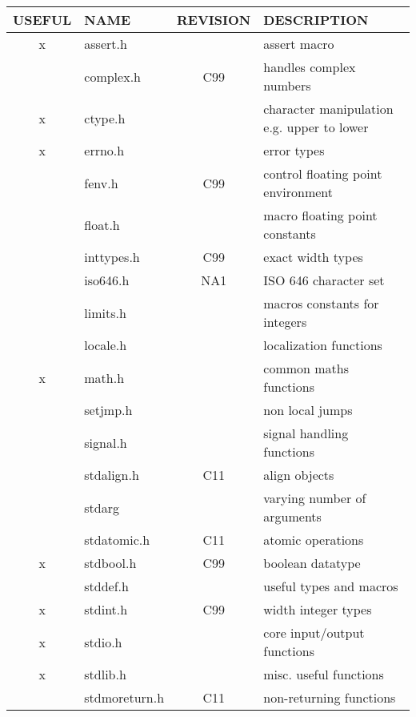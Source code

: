 
\begin{table}
\centering
  \begin{tabular}{ | c | l | c | l |}
    \hline
    USEFUL & NAME & REVISION & DESCRIPTION \\ \hline
    x          & assert.h &  & assert macro \\ \hline
               & complex.h & C99 & handles complex numbers \\ \hline
    x		   & ctype.h & & character manipulation e.g. upper to lower \\ \hline
    x          & errno.h &  & error types \\ \hline
               & fenv.h & C99 & control floating point environment \\ \hline
               & float.h &  & macro floating point constants \\ \hline
               & inttypes.h & C99 & exact width types \\ \hline
               & iso646.h & NA1 & ISO 646 character set \\ \hline
               & limits.h &  & macros constants for integers \\ \hline
               & locale.h &  & localization functions \\ \hline
    x          & math.h &  & common maths functions \\ \hline
               & setjmp.h &  & non local jumps \\ \hline
               & signal.h &  & signal handling functions \\ \hline
               & stdalign.h &  C11 & align objects \\ \hline
               & stdarg &  & varying number of arguments \\ \hline
               & stdatomic.h & C11 & atomic operations \\ \hline
    x          & stdbool.h & C99 & boolean datatype \\ \hline
               & stddef.h &  & useful types and macros \\ \hline
    x          & stdint.h & C99 & width integer types \\ \hline
    x          & stdio.h &  & core input/output functions \\ \hline
    x          & stdlib.h &  & misc. useful functions \\ \hline
               & stdmoreturn.h & C11 & non-returning functions \\ \hline

\end{tabular}
\end{table}
